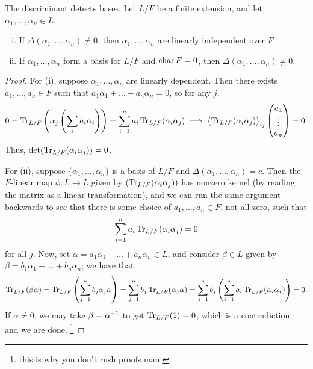 \begin{proposition} \label{prop:discriminant_detects_bases}
    The discriminant detects bases. Let $L/F$ be a finite extension, and let $\alpha_1, \dots, \alpha_n \in L$.
    \begin{enumerate}[(i)]
        \item If $\Delta(\alpha_1, \dots, \alpha_n) \neq 0$, then $\alpha_1, \dots, \alpha_n$ are linearly independent over $F$.
        \item If $\alpha_1, \dots, \alpha_n$ form a basis for $L/F$ and $\operatorname{char} F = 0$, then $\Delta(\alpha_1, \dots, \alpha_n) \neq 0$.
    \end{enumerate}
\end{proposition}
\begin{proof}
    For (i), suppose $\alpha_1, \dots, \alpha_n$ are linearly dependent. Then there exists $a_1, \dots, a_n \in F$ such that $a_1 \alpha_1 + \dots + a_n \alpha_n = 0$, so for any $j$,
    \[ 0 = \operatorname{Tr}_{L/F} \left(\alpha_j \left(\sum_i a_i \alpha_i\right)\right) = \sum_{i=1}^n a_i \operatorname{Tr}_{L/F} (\alpha_i \alpha_j) \implies \bigl(\operatorname{Tr}_{L/F}(\alpha_i \alpha_j)\bigr)_{ij} \begin{pmatrix} a_1 \\ \vdots \\ a_n \end{pmatrix} = 0. \]
    Thus, $\det (\operatorname{Tr}_{L/F}(\alpha_i \alpha_j)) = 0$.

    
    For (ii), suppose $\{\alpha_1, \dots, \alpha_n\}$ is a basis of $L/F$ and $\Delta(\alpha_1, \dots, \alpha_n) = c$. Then the $F$-linear map $\phi \colon L \to L$ given by $(\operatorname{Tr}_{L/F}(\alpha_i \alpha_j))$ has nonzero kernel (by reading the matrix as a linear transformation), and we can run the same argument backwards to see that there is some choice of $a_1, \dots, a_n \in F$, not all zero, such that
    \[ \sum_{i=1}^n a_i \operatorname{Tr}_{L/F}(\alpha_i \alpha_j) = 0 \]
    for all $j$. Now, set $\alpha = a_1 \alpha_1 + \dots + a_n \alpha_n \in L$, and consider $\beta \in L$ given by $\beta = b_1\alpha_1 + \dots + b_n\alpha_n$; we have that
    \[ \operatorname{Tr}_{L/F}(\beta \alpha) = \operatorname{Tr}_{L/F} \left(\sum_{j=1}^n b_j \alpha_j \alpha\right) = \sum_{j=1}^n b_j \operatorname{Tr}_{L/F}(\alpha_j \alpha) = \sum_{j=1}^n b_j \left(\sum_{i=1}^n a_i \operatorname{Tr}_{L/F}(\alpha_i \alpha_j)\right) = 0. \]
    If $\alpha \neq 0$, we may take $\beta = \alpha^{-1}$ to get $\operatorname{Tr}_{L/F}(1) = 0$, which is a contradiction, and we are done. \footnote{this is why you don't rush proofs man.}
\end{proof}